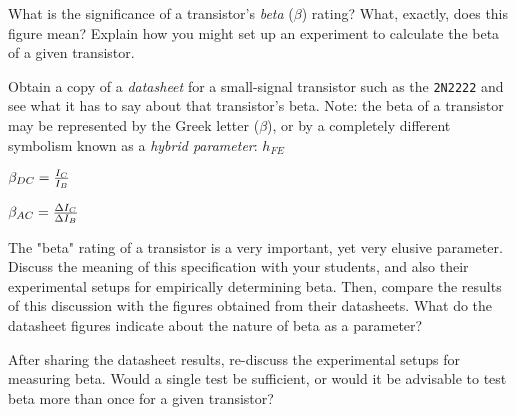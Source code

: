 

What is the significance of a transistor's {\it beta} ($\beta$) rating?  What, exactly, does this figure mean?  Explain how you might set up an experiment to calculate the beta of a given transistor.

\vskip 5pt

Obtain a copy of a {\it datasheet} for a small-signal transistor such as the {\tt 2N2222} and see what it has to say about that transistor's beta.  Note: the beta of a transistor may be represented by the Greek letter ($\beta$), or by a completely different symbolism known as a {\it hybrid parameter}: $h_{FE}$







$\beta_{DC} = {I_C \over I_B}$

\vskip 10pt

$\beta_{AC} = {\Delta I_C \over \Delta I_B}$







The "beta" rating of a transistor is a very important, yet very elusive parameter.  Discuss the meaning of this specification with your students, and also their experimental setups for empirically determining beta.  Then, compare the results of this discussion with the figures obtained from their datasheets.  What do the datasheet figures indicate about the nature of beta as a parameter?

After sharing the datasheet results, re-discuss the experimental setups for measuring beta.  Would a single test be sufficient, or would it be advisable to test beta more than once for a given transistor?




